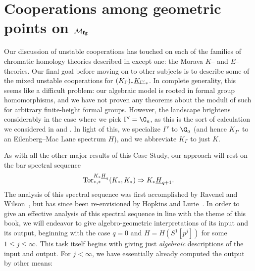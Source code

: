 \section{Cooperations among geometric points on \texorpdfstring{\(\mathcal{M}_{\mathbf{fg}}\)}{Mfg}}\label{CoopnsForMoravaKandHA}


Our discussion of unstable cooperations has touched on each of the families of chromatic homology theories described in  except one: the Morava \(K\)-- and \(E\)--theories.  Our final goal before moving on to other subjects is to describe some of the mixed unstable cooperations for \((K_\Gamma)_* \underline{\smash{K_{\Gamma'}}}_{*}\).  In complete generality, this seems like a difficult problem: our algebraic model is rooted in formal group homomorphisms, and we have not proven any theorems about the moduli of such for arbitrary finite-height formal groups.  However, the landscape brightens considerably in the case where we pick \(\Gamma' = \G_a\), as this is the sort of calculation we considered in  and .  In light of this, we specialize \(\Gamma'\) to \(\G_a\) (and hence \(K_{\Gamma'}\) to an Eilenberg--Mac Lane spectrum \(H\)), and we abbreviate \(K_\Gamma\) to just \(K\).

As with all the other major results of this Case Study, our approach will rest on the bar spectral sequence \[\operatorname{Tor}^{K_* \underline{\smash{H}}_{q}}_{*, *}(K_*, K_*) \Rightarrow K_* \underline{\smash{H}}_{q+1}.\]  The analysis of this spectral sequence was first accomplished by Ravenel and Wilson~\cite{RavenelWilsonKthyOfEMSpaces}, but has since been re-envisioned by Hopkins and Lurie~\cite[Section 2]{HopkinsLurie}.  In order to give an effective analysis of this spectral sequence in line with the theme of this book, we will endeavor to give algebro-geometric interpretations of its input and its output, beginning with the case \(q = 0\) and \(H = H(S^1[p^j])\) for some \(1 \le j \le \infty\).  This task itself begins with giving just \emph{algebraic} descriptions of the input and output.  For \(j < \infty\), we have essentially already computed the output by other means:

